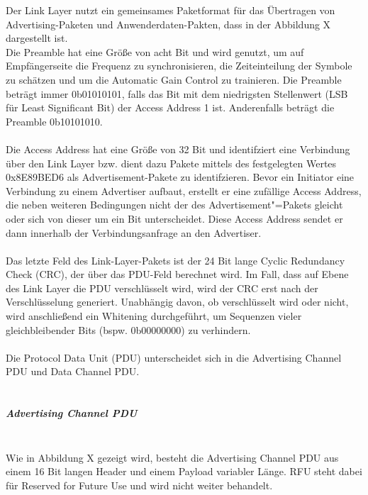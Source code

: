Der Link Layer nutzt ein gemeinsames Paketformat für das Übertragen von Advertising-Paketen und Anwenderdaten-Pakten, dass in der Abbildung X
dargestellt ist.\\

Die Preamble hat eine Größe von acht Bit und wird genutzt, um auf Empfängerseite die Frequenz zu synchronisieren, die Zeiteinteilung der Symbole zu schätzen und um die Automatic Gain Control zu trainieren. Die Preamble beträgt immer 0b01010101, falls das Bit mit dem niedrigsten Stellenwert (LSB für Least Significant Bit) der Access Address 1 ist. Anderenfalls beträgt die Preamble 0b10101010.
\\\\
Die Access Address hat eine Größe von 32 Bit und identifziert eine Verbindung über den Link Layer bzw. dient dazu Pakete mittels des festgelegten Wertes 0x8E89BED6 als Advertisement-Pakete zu identifzieren. Bevor ein Initiator eine Verbindung zu einem Advertiser aufbaut, erstellt er eine zufällige Access Address, die neben weiteren Bedingungen nicht der des Advertisement"=Pakets gleicht oder sich von dieser um ein Bit unterscheidet. Diese Access Address sendet er dann innerhalb der Verbindungsanfrage an den Advertiser.
\\\\
Das letzte Feld des Link-Layer-Pakets ist der 24 Bit lange Cyclic Redundancy Check (CRC), der über das PDU-Feld berechnet wird. Im Fall, dass auf Ebene des Link Layer die PDU verschlüsselt wird, wird der CRC erst nach der Verschlüsselung generiert. Unabhängig davon, ob verschlüsselt wird oder nicht, wird anschließend ein Whitening durchgeführt, um Sequenzen vieler gleichbleibender Bits (bspw. 0b00000000) zu verhindern.
\\\\
Die Protocol Data Unit (PDU) unterscheidet sich in die Advertising Channel PDU und Data Channel PDU.
\\\\

\subparagraph{Advertising Channel PDU} \mbox{} \vspace{0.2cm} \\
Wie in Abbildung X 
gezeigt wird, besteht die Advertising Channel PDU aus einem 16 Bit langen Header und einem Payload variabler Länge. RFU steht dabei für Reserved for Future Use und wird nicht weiter behandelt.

